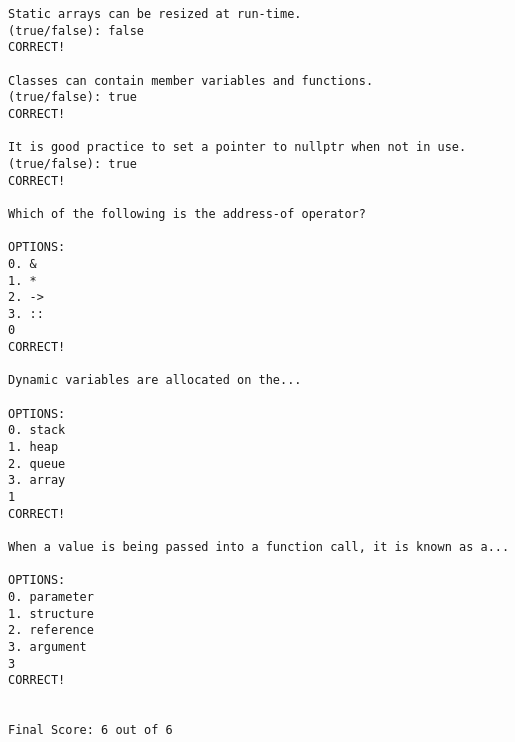 \documentclass[a4paper,12pt]{book}
\begin{document}
\begin{lstlisting}[style=output]
Static arrays can be resized at run-time.
(true/false): false
CORRECT!

Classes can contain member variables and functions.
(true/false): true
CORRECT!

It is good practice to set a pointer to nullptr when not in use.
(true/false): true
CORRECT!

Which of the following is the address-of operator?

OPTIONS:
0. &
1. *
2. ->
3. ::
0
CORRECT!

Dynamic variables are allocated on the...

OPTIONS:
0. stack
1. heap
2. queue
3. array
1
CORRECT!

When a value is being passed into a function call, it is known as a...

OPTIONS:
0. parameter
1. structure
2. reference
3. argument
3
CORRECT!


Final Score: 6 out of 6
\end{lstlisting}

\end{document}
